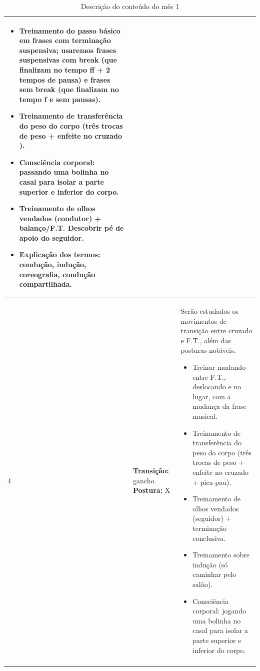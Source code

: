 \documentclass[12pt, a4paper]{article}
\begin{document}
\begin{longtable}{|p{0.5cm}|p{3.0cm}|p{12.0cm}|}
\begin{itemize}
        \item Treinamento do passo básico em frases com terminação suspensiva; 
usaremos frases suspensivas com break (que finalizam no tempo ff + 2 tempos de pausa) e frases sem break (que finalizam no tempo f e sem pausas). 
        \item Treinamento de transferência do peso do corpo (três trocas de peso + enfeite no cruzado ).
        \item Consciência corporal: passando uma bolinha no casal para isolar a parte superior e inferior do corpo.
        \item Treinamento de olhos vendados (condutor) + balanço/F.T. Descobrir pé de apoio do seguidor.
        \item Explicação dos termos: condução, indução, coreografia, condução compartilhada.
        \end{itemize}
        \\ \hline
4 &  \textbf{Transição:} gancho. \textbf{Postura:} X &  Serão estudados os movimentos de transição entre cruzado e F.T., além das posturas notáveis.
        \begin{itemize}
        \item Treinar mudando entre F.T., deslocando e no lugar, com a mudança da frase musical.
        \item Treinamento de transferência do peso do corpo (três trocas de peso + enfeite no cruzado + pica-pau).
        \item Treinamento de  olhos vendados (seguidor) + terminação conclusiva.
        \item Treinamento sobre indução (só caminhar pelo salão).
        \item Consciência corporal: jogando uma bolinha no casal para isolar a parte superior e inferior do corpo.
        \end{itemize}
        \\ \hline 
\caption{Descrição do conteúdo do mês 1}
\label{tab:myfirsttable}
\end{longtable}
\end{document}
